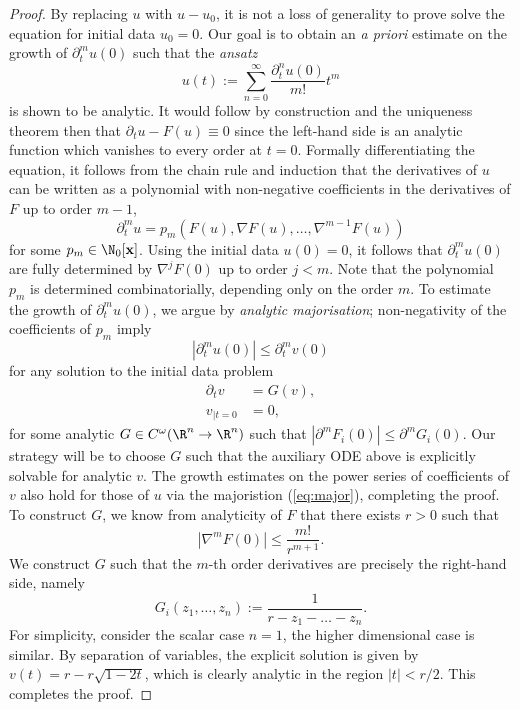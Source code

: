 \begin{proof}
	By replacing $u$ with $u - u_0$, it is not a loss of generality to prove solve the equation for initial data $u_0 = 0$. Our goal is to obtain an \textit{a priori} estimate on the growth of $\partial_t^m u(0)$ such that the \textit{ansatz}
		\[ u(t) := \sum_{n = 0}^\infty \frac{\partial^n_t u (0)}{m!} t^m \]	
	is shown to be analytic. It would follow by construction and the uniqueness theorem then that $\partial_t u - F(u) \equiv 0$ since the left-hand side is an analytic function which vanishes to every order at $t = 0$. Formally differentiating the equation, it follows from the chain rule and induction that the derivatives of $u$ can be written as a polynomial with non-negative coefficients in the derivatives of $F$ up to order $m - 1$,
		\[ \partial_t^m u = p_m ( F (u),  \nabla F(u), \dots, \nabla^{m - 1} F(u)) \]
	for some $p_m \in \N_0 [\vec x]$. Using the initial data $u(0) = 0$, it follows that $\partial_t^m u (0)$ are fully determined by $\nabla^j F(0)$ up to order $j < m$. Note that the polynomial $p_m$ is determined combinatorially, depending only on the order $m$. To estimate the growth of $\partial_t^m u (0)$, we argue by \textit{analytic majorisation}; non-negativity of the coefficients of $p_m$ imply 
		\begin{equation}
			|\partial^m_t u (0)| \leq \partial^m_t v(0)
			\tag{*}
			\label{eq:major}  
		\end{equation}	
	for any solution to the initial data problem	
		\begin{align*}
			\partial_t v 
				&= G(v) ,\\
			v_{|t = 0}
				&= 0,	
		\end{align*}
	for some analytic $G \in C^\omega (\R^n \to \R^n)$ such that $|\partial^m F_i (0)| \leq \partial^m G_i (0)$. Our strategy will be to choose $G$ such that the auxiliary ODE above is explicitly solvable for analytic $v$. The growth estimates on the power series of coefficients of $v$ also hold for those of $u$ via the majoristion (\ref{eq:major}), completing the proof. To construct $G$, we know from analyticity of $F$ that there exists $r > 0$ such that
		\[ |\nabla^m F(0)| \leq \frac{m!}{r^{m + 1}}. \]
	We construct $G$ such that the $m$-th order derivatives are precisely the right-hand side, namely
		\[  G_i (z_1, \dots, z_n) := \frac{1}{r - z_1 - \dots - z_n}. \]	
	For simplicity, consider the scalar case $n = 1$, the higher dimensional case is similar. By separation of variables, the explicit solution is given by $v(t) = r - r \sqrt{1 - 2t}$, which is clearly analytic in the region $|t| < r/2$. This completes the proof. 
\end{proof}


